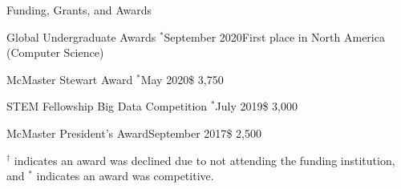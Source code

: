 \begin{rSection}{Funding, Grants, and Awards}
\begin{aSubsection}{Global Undergraduate Awards $^{\ast}$}{September 2020}{First place in North America (Computer Science)}
\end{aSubsection}

\begin{aSubsection}{McMaster Stewart Award $^{\ast}$}{May 2020}{\$ 3,750}{}
\end{aSubsection}


\begin{aSubsection}{STEM Fellowship Big Data Competition $^{\ast}$}{July 2019}{\$ 3,000}{}
\end{aSubsection}

\begin{aSubsection}{McMaster President's Award}{September 2017}{\$ 2,500}{}
\end{aSubsection}

\smallskip
$^\dagger$ indicates an award was declined due to not attending the funding institution, and $^{\ast}$ indicates an award was competitive.

\end{rSection}

